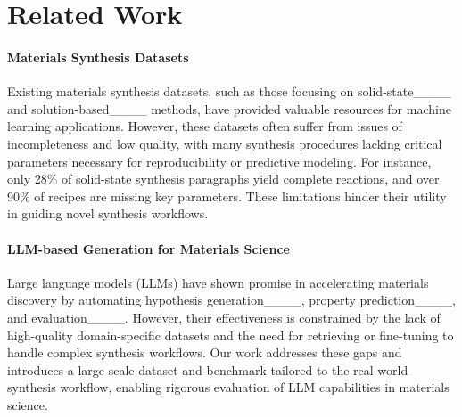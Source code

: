 \section{Related Work}
\paragraph*{Materials Synthesis Datasets}

Existing materials synthesis datasets, such as those focusing on solid-state____ and solution-based____ methods, have provided valuable resources for machine learning applications. However, these datasets often suffer from issues of incompleteness and low quality, with many synthesis procedures lacking critical parameters necessary for reproducibility or predictive modeling. For instance, only 28\% of solid-state synthesis paragraphs yield complete reactions, and over 90\% of recipes are missing key parameters. These limitations hinder their utility in guiding novel synthesis workflows.

\paragraph*{LLM-based Generation for Materials Science}

Large language models (LLMs) have shown promise in accelerating materials discovery by automating hypothesis generation____, property prediction____, and evaluation____. However, their effectiveness is constrained by the lack of high-quality domain-specific datasets and the need for retrieving or fine-tuning to handle complex synthesis workflows. Our work addresses these gaps and introduces a large-scale dataset and benchmark tailored to the real-world synthesis workflow, enabling rigorous evaluation of LLM capabilities in materials science.


%